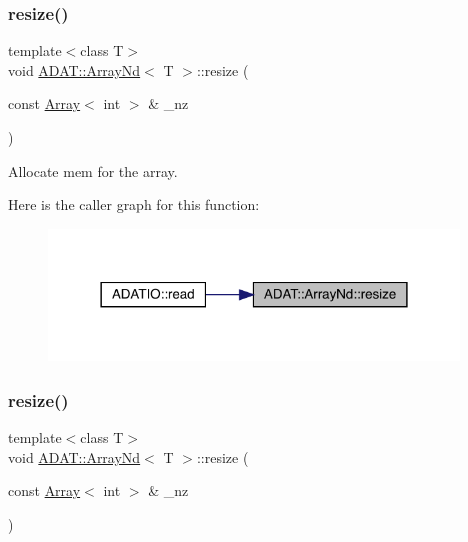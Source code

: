 \subsubsection{\texorpdfstring{resize()}{resize()}\hspace{0.1cm}{\footnotesize\ttfamily [2/15]}}
{\footnotesize\ttfamily template$<$class T$>$ \\
void \mbox{\hyperlink{classADAT_1_1ArrayNd}{A\+D\+A\+T\+::\+Array\+Nd}}$<$ T $>$\+::resize (\begin{DoxyParamCaption}\item[{const \mbox{\hyperlink{classXMLArray_1_1Array}{Array}}$<$ int $>$ \&}]{\+\_\+nz }\end{DoxyParamCaption})\hspace{0.3cm}{\ttfamily [inline]}}



Allocate mem for the array. 

Here is the caller graph for this function\+:
\nopagebreak
\begin{figure}[H]
\begin{center}
\leavevmode
\includegraphics[width=309pt]{d1/db2/classADAT_1_1ArrayNd_afcf13cf80c4cb861316d1ad55601818e_icgraph}
\end{center}
\end{figure}
\mbox{\label{classADAT_1_1ArrayNd_afcf13cf80c4cb861316d1ad55601818e}} 
\subsubsection{\texorpdfstring{resize()}{resize()}\hspace{0.1cm}{\footnotesize\ttfamily [3/15]}}
{\footnotesize\ttfamily template$<$class T$>$ \\
void \mbox{\hyperlink{classADAT_1_1ArrayNd}{A\+D\+A\+T\+::\+Array\+Nd}}$<$ T $>$\+::resize (\begin{DoxyParamCaption}\item[{const \mbox{\hyperlink{classXMLArray_1_1Array}{Array}}$<$ int $>$ \&}]{\+\_\+nz }\end{DoxyParamCaption})\hspace{0.3cm}{\ttfamily [inline]}}



